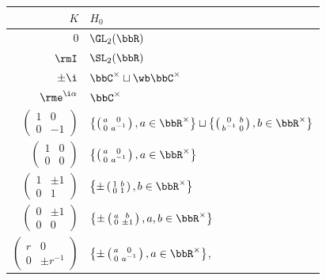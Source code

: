 \begin{center}
    \begin{tabular}{r l} 
     $K$ & $H_0$ \\ [0.5ex] 
     \hline
     $0$ & $\GL_2(\bbR)$\\
     $\rmI$ & $\SL_2(\bbR)$\\
     $\pm\i$ & $\bbC^\times\sqcup \wb\bbC^\times$\\
     $\rme^{\i\alpha}$ & $\bbC^\times$\\

     $\left(\begin{smallmatrix}
        1 & 0\\0 & -1
     \end{smallmatrix}\right)$ & $\left\{\left(\begin{smallmatrix}
        a & 0\\0 & a^{-1}
     \end{smallmatrix}\right),a\in\bbR^\times\right\}\sqcup \left\{\left(\begin{smallmatrix}
        0 & b\\b^{-1} & 0
     \end{smallmatrix}\right),b\in\bbR^\times\right\}$\\
     $\left(\begin{smallmatrix}
        1 & 0\\0 & 0
     \end{smallmatrix}\right)$ & $\left\{\left(\begin{smallmatrix}
        a & 0\\0 & a^{-1}
     \end{smallmatrix}\right),a\in\bbR^\times\right\}$\\
     $\left(\begin{smallmatrix}
        1 & \pm 1\\0 & 1
     \end{smallmatrix}\right)$ & $\left\{\pm\left(\begin{smallmatrix}
        1 & b\\0 & 1
     \end{smallmatrix}\right),b\in\bbR^\times\right\}$\\
     $\left(\begin{smallmatrix}
        0 & \pm 1\\0 & 0
     \end{smallmatrix}\right)$ & $\left\{\pm\left(\begin{smallmatrix}
        a & b\\0 & \pm 1
     \end{smallmatrix}\right),a,b\in\bbR^\times\right\}$\\
     $\left(\begin{smallmatrix}
        r & 0\\0 & \pm r^{-1}
     \end{smallmatrix}\right)$ & $\left\{\pm\left(\begin{smallmatrix}
        a & 0\\0 & a^{-1}
     \end{smallmatrix}\right),a\in\bbR^\times\right\}$,\\
     \hline
    \end{tabular}
\end{center}
